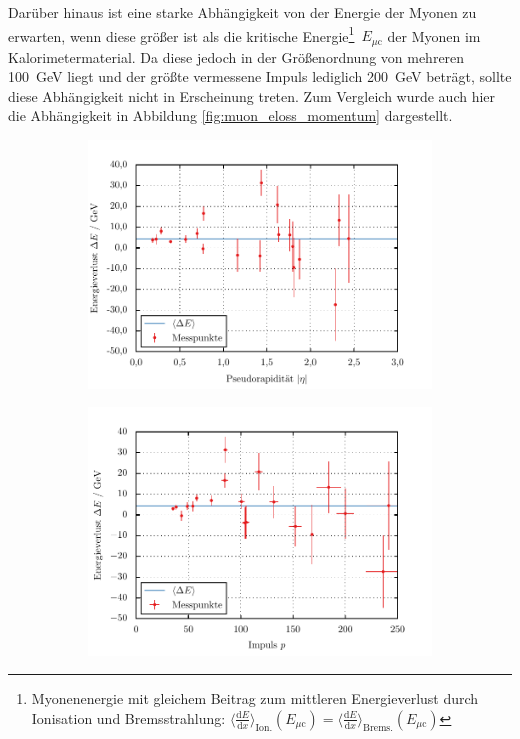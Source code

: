 \documentclass[11pt, a4paper]{article}
\numberwithin{equation}{section}
\begin{document}
Darüber hinaus ist eine starke Abhängigkeit von der Energie der Myonen zu erwarten, wenn diese größer ist als die kritische Energie\footnote{Myonenenergie mit gleichem Beitrag zum mittleren Energieverlust durch Ionisation und Bremsstrahlung: $\langle \frac{\mathrm{d}E}{\mathrm{d}x} \rangle_\mathrm{Ion.}(E_{\mu\mathrm{c}}) = \langle \frac{\mathrm{d}E}{\mathrm{d}x} \rangle_\mathrm{Brems.}(E_{\mu\mathrm{c}})$}~$E_{\mu\mathrm{c}}$ der Myonen im Kalorimetermaterial.
Da diese jedoch in der Größenordnung von mehreren \SI{100}{\GeV} \cite{pdg} liegt und der größte vermessene Impuls lediglich \SI{200}{\GeV} beträgt, sollte diese Abhängigkeit nicht in Erscheinung treten.
Zum Vergleich wurde auch hier die Abhängigkeit in Abbildung \ref{fig:muon_eloss_momentum} dargestellt.
\begin{figure}[hp]
	\begin{subfigure}{1.0\textwidth}
		\centering
		\includegraphics{./figures/muon_energy_loss/eta.pdf}
		\subcaption{}
		\label{fig:muon_eloss_eta}
	\end{subfigure}
	\begin{subfigure}{1.0\textwidth}
			\centering
			\includegraphics{./figures/muon_energy_loss/momentum.pdf}

\end{subfigure}
\end{figure}
\end{document}
